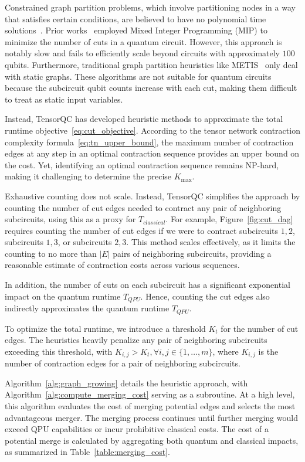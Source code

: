 Constrained graph partition problems,
which involve partitioning nodes in a way that satisfies certain conditions,
are believed to have no polynomial time solutions~\cite{andreev2006balanced, karypis1998fast}.
Prior works~\cite{tang2021cutqc} employed Mixed Integer Programming (MIP) to minimize the number of cuts in a quantum circuit.
However, this approach is notably slow and fails to efficiently scale beyond circuits with approximately $100$ qubits.
Furthermore, traditional graph partition heuristics like METIS~\cite{karypis1998multilevelk} only deal with static graphs.
These algorithms are not suitable for quantum circuits because the subcircuit qubit counts increase with each cut,
making them difficult to treat as static input variables.

Instead, TensorQC has developed heuristic methods to approximate the total runtime objective~\ref{eq:cut_objective}.
According to the tensor network contraction complexity formula~\ref{eq:tn_upper_bound},
the maximum number of contraction edges at any step in an optimal contraction sequence provides an upper bound on the cost.
Yet, identifying an optimal contraction sequence remains NP-hard,
making it challenging to determine the precise $K_{\max}$.

Exhaustive counting does not scale.
Instead, TensorQC simplifies the approach by counting the number of cut edges needed to contract any pair of neighboring subcircuits,
using this as a proxy for $T_{classical}$.
For example, Figure~\ref{fig:cut_dag} requires counting the number of cut edges if we were to contract
subcircuits $1,2$, subcircuits $1,3$, or subcircuits $2,3$.
This method scales effectively,
as it limits the counting to no more than $|E|$ pairs of neighboring subcircuits,
providing a reasonable estimate of contraction costs across various sequences.

In addition, the number of cuts on each subcircuit has a significant exponential impact on the quantum runtime $T_{QPU}$.
Hence, counting the cut edges also indirectly approximates the quantum runtime $T_{QPU}$.

To optimize the total runtime,
we introduce a threshold $K_{t}$ for the number of cut edges.
The heuristics heavily penalize any pair of neighboring subcircuits exceeding this threshold,
with $K_{i,j}>K_{t}, \forall i,j\in \{1,\ldots,m\}$,
where $K_{i,j}$ is the number of contraction edges for a pair of neighboring subcircuits.

Algorithm~\ref{alg:graph_growing} details the heuristic approach,
with Algorithm~\ref{alg:compute_merging_cost} serving as a subroutine.
At a high level, this algorithm evaluates the cost of merging potential edges and selects the most advantageous merger.
The merging process continues until further merging would exceed QPU capabilities or incur prohibitive classical costs.
The cost of a potential merge is calculated by aggregating both quantum and classical impacts,
as summarized in Table~\ref{table:merging_cost}.